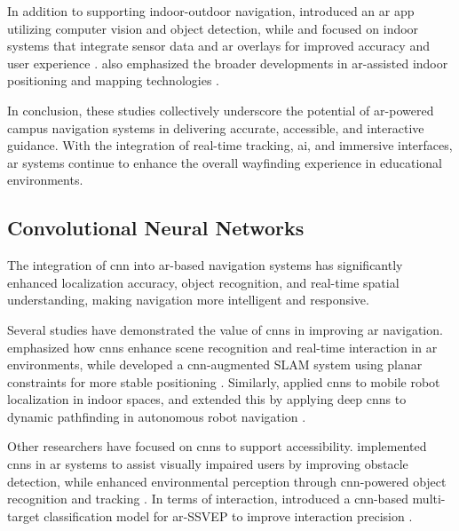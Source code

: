 \begin{refsection}
In addition to supporting indoor-outdoor navigation, \citeauthor{five} \citeyear{five} introduced an \gls{ar} app utilizing computer vision and object detection, while \citeauthor{eleven} \citeyear{eleven} and \citeauthor{fifteen} \citeyear{fifteen} focused on indoor systems that integrate sensor data and \gls{ar} overlays for improved accuracy and user experience \cite{ten, eleven, fifteen}. \citeauthor{fourteen} \citeyear{fourteen} also emphasized the broader developments in \gls{ar}-assisted indoor positioning and mapping technologies \cite{fourteen}.

In conclusion, these studies collectively underscore the potential of \gls{ar}-powered campus navigation systems in delivering accurate, accessible, and interactive guidance. With the integration of real-time tracking, \gls{ai}, and immersive interfaces, \gls{ar} systems continue to enhance the overall wayfinding experience in educational environments.

\subsection{Convolutional Neural Networks}

The integration of \gls{cnn} into \gls{ar}-based navigation systems has significantly enhanced localization accuracy, object recognition, and real-time spatial understanding, making navigation more intelligent and responsive.

Several studies have demonstrated the value of \gls{cnn}s in improving \gls{ar} navigation. \citeauthor{twentytwo} \citeyear{twentytwo} emphasized how \gls{cnn}s enhance scene recognition and real-time interaction in \gls{ar} environments, while \citeauthor{twenty} \citeyear{twenty} developed a \gls{cnn}-augmented SLAM system using planar constraints for more stable positioning \cite{twentytwo, twenty}. Similarly, \citeauthor{seventeen} \citeyear{seventeen} applied \gls{cnn}s to mobile robot localization in indoor spaces, and \citeauthor{twentyfive}\citeyear{twentyfive} extended this by applying deep \gls{cnn}s to dynamic pathfinding in autonomous robot navigation \cite{seventeen, twentyfive}.

Other researchers have focused on \gls{cnn}s to support accessibility. \citeauthor{sixteen} \citeyear{sixteen} implemented \gls{cnn}s in \gls{ar} systems to assist visually impaired users by improving obstacle detection, while \citeauthor{eighteen} \citeyear{eighteen} enhanced environmental perception through \gls{cnn}-powered object recognition and tracking \cite{sixteen, eighteen}. In terms of interaction, \citeauthor{twentyone} \citeyear{twentyone} introduced a \gls{cnn}-based multi-target classification model for \gls{ar}-SSVEP to improve interaction precision \cite{twentyone}.


\end{refsection}

